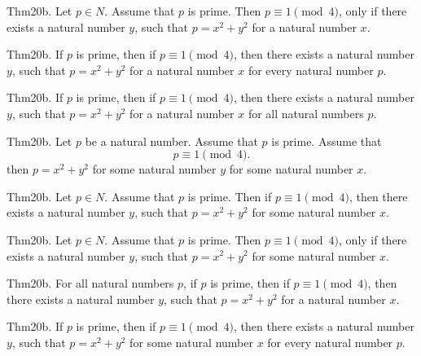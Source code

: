 \documentclass{article}
\begin{document}
Thm20b. Let $p \in N$. Assume that $p$ is prime. Then $p \equiv 1 \pmod{ 4}$, only if there exists a natural number $y$, such that $p = x ^{ 2}+ y ^{ 2}$ for a natural number $x$.

Thm20b. If $p$ is prime, then if $p \equiv 1 \pmod{ 4}$, then there exists a natural number $y$, such that $p = x ^{ 2}+ y ^{ 2}$ for a natural number $x$ for every natural number $p$.

Thm20b. If $p$ is prime, then if $p \equiv 1 \pmod{ 4}$, then there exists a natural number $y$, such that $p = x ^{ 2}+ y ^{ 2}$ for a natural number $x$ for all natural numbers $p$.

Thm20b. Let $p$ be a natural number. Assume that $p$ is prime. Assume that $$p \equiv 1 \pmod{ 4}.$$ then $p = x ^{ 2}+ y ^{ 2}$ for some natural number $y$ for some natural number $x$.

Thm20b. Let $p \in N$. Assume that $p$ is prime. Then if $p \equiv 1 \pmod{ 4}$, then there exists a natural number $y$, such that $p = x ^{ 2}+ y ^{ 2}$ for some natural number $x$.

Thm20b. Let $p \in N$. Assume that $p$ is prime. Then $p \equiv 1 \pmod{ 4}$, only if there exists a natural number $y$, such that $p = x ^{ 2}+ y ^{ 2}$ for some natural number $x$.

Thm20b. For all natural numbers $p$, if $p$ is prime, then if $p \equiv 1 \pmod{ 4}$, then there exists a natural number $y$, such that $p = x ^{ 2}+ y ^{ 2}$ for a natural number $x$.

Thm20b. If $p$ is prime, then if $p \equiv 1 \pmod{ 4}$, then there exists a natural number $y$, such that $p = x ^{ 2}+ y ^{ 2}$ for some natural number $x$ for every natural number $p$.
\end{document}
